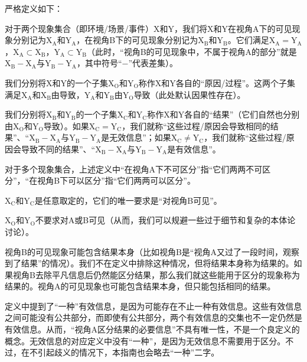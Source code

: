 \begin{framed}
    \vspace{-0.2em}
    \noindent 严格定义如下：

    对于两个现象集合（即环境/场景/事件）X和Y，我们将X和Y在视角A下的可见现象分别记为$\mathrm{X_A}$和$\mathrm{Y_A}$，在视角B下的可见现象分别记为$\mathrm{X_B}$和$\mathrm{Y_B}$。它们满足$\mathrm{X_A}=\mathrm{Y_A}$，$\mathrm{X_A}\subset \mathrm{X_B}$，$\mathrm{Y_A}\subset \mathrm{Y_B}$（此时，“视角B的可见现象中，不属于视角A的部分”就是$\mathrm{X_B}-\mathrm{X_A}$与$\mathrm{Y_B}-\mathrm{Y_A}$，其中符号“$-$”代表差集）。

    我们分别将X和Y的一个子集$\mathrm{X_O}$和$\mathrm{Y_O}$称作X和Y各自的“原因/过程”。这两个子集满足$\mathrm{X_A}$和$\mathrm{X_B}$由导致，$\mathrm{Y_A}$和$\mathrm{Y_B}$由$\mathrm{Y_O}$导致（此处默认因果性存在）。

    我们分别将$\mathrm{X_B}$和$\mathrm{Y_B}$的一个子集$\mathrm{X_C}$和$\mathrm{Y_C}$称作X和Y各自的“结果”（它们自然也分别由$\mathrm{X_O}$和$\mathrm{Y_O}$导致）。如果$\mathrm{X_C}=\mathrm{Y_C}$，我们就称“这些过程/原因会导致相同的结果”、“$\mathrm{X_B}-\mathrm{X_A}$与$\mathrm{Y_B}-\mathrm{Y_A}$是无效信息”；如果$\mathrm{X_C}\ne \mathrm{Y_C}$，我们就称“这些过程/原因会导致不同的结果”、“$\mathrm{X_B}-\mathrm{X_A}$与$\mathrm{Y_B}-\mathrm{Y_A}$是有效信息”。

    对于多个现象集合，上述定义中“在视角A下不可区分”指“它们两两不可区分”，“在视角B下可以区分”指“它们两两可以区分”。
    \begin{explain}
    $\mathrm{X_C}$和$\mathrm{Y_C}$是任意取定的，它们的唯一要求是“对视角B可见”。

    $\mathrm{X_O}$和$\mathrm{Y_O}$不要求对A或B可见（从而，我们可以规避一些过于细节和复杂的本体论讨论）。%
    \vspace{-0.2em}
    \end{explain}
\end{framed}
\begin{explain}
视角B的可见现象可能包含结果本身（比如视角B是“视角A又过了一段时间，观察到了结果”的情况）。我们不在定义中排除这种情况，但将结果本身称为结果的。如果视角B去除平凡信息后仍然能区分结果，那么我们就这些能用于区分的现象称为结果的。视角A的可见现象也可能包含结果本身，但只能包括相同的结果。

定义中提到了“一种”有效信息，是因为可能存在不止一种有效信息。这些有效信息之间可能没有公共部分，而即使有公共部分，两个有效信息的交集也不一定仍然是有效信息。从而，“视角A区分结果的必要信息”不具有唯一性，不是一个良定义的概念。无效信息的对应定义中没有“一种”，是因为无效信息不需要用于区分。不过，在不引起歧义的情况下，本指南也会略去“一种”二字。
\end{explain}

